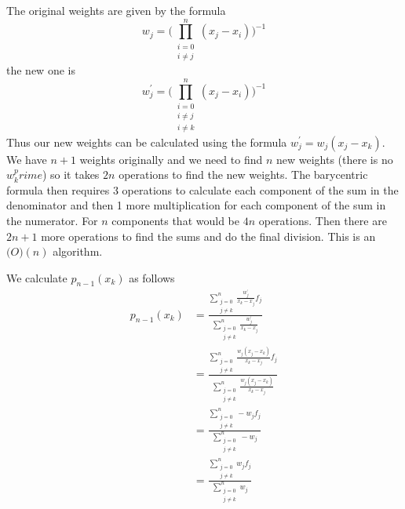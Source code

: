 \documentclass[12pt]{article}
\begin{document}
	The original weights are given by the formula
	$$
	w_j = \Big( \prod\limits_{\substack{ i=0 \\ i\neq j}}^n (x_j-x_i) \Big)^{-1}
	$$
	the new one is
	$$
	w_j^\prime = \Big( \prod\limits_{\substack{ i=0 \\ i\neq j \\ i\neq k}}^n (x_j-x_i) \Big)^{-1}
	$$
	Thus our new weights can be calculated using the formula $w_j^\prime = w_j(x_j-x_k)$. We have $n+1$ weights originally and we need to find $n$ new weights (there is no $w_k^prime$) so it takes $2n$ operations to find the new weights. The barycentric formula then requires 3 operations to calculate each component of the sum in the denominator and then 1 more multiplication for each component of the sum in the numerator. For $n$ components that would be $4n$ operations. Then there are $2n +1$ more operations to find the sums and do the final division. This is an $\mathcal(O)(n)$ algorithm. \bigbreak
	
	We calculate  $p_{n-1}(x_k)$ as follows
	\begin{align*}
		p_{n-1}(x_k) & = \frac{\sum\limits_{\substack{ j=0 \\ j \neq k}}^n \frac{w_j^\prime}{x_k-x_j}f_j}{\sum\limits_{\substack{ j=0 \\ j \neq k}}^n \frac{w_j^\prime}{x_k-x_j}} \\
		& = \frac{\sum\limits_{\substack{ j=0 \\ j \neq k}}^n \frac{w_j(x_j-x_k)}{x_k-x_j}f_j}{\sum\limits_{\substack{ j=0 \\ j \neq k}}^n \frac{w_j(x_j-x_k)}{x_k-x_j}} \\
		& = \frac{\sum\limits_{\substack{ j=0 \\ j \neq k}}^n -w_jf_j}{\sum\limits_{\substack{ j=0 \\ j \neq k}}^n -w_j} \\
		& = \frac{\sum\limits_{\substack{ j=0 \\ j \neq k}}^n w_jf_j}{\sum\limits_{\substack{ j=0 \\ j \neq k}}^n w_j}
	\end{align*}
	
	
\end{document}
